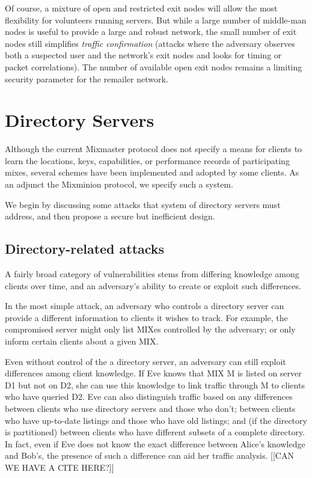 \documentclass{llncs}
\begin{document}
Of course, a mixture of open and restricted exit nodes will allow the
most flexibility for volunteers running servers. But while a large number
of middle-man nodes is useful to provide a large and robust network, the
small number of exit nodes still simplifies \emph{traffic confirmation}
(attacks where the adversary observes both a suspected user and the
network's exit nodes and looks for timing or packet correlations). The
number of available open exit nodes remains a limiting security parameter
for the remailer network.


\section{Directory Servers}
\label{sec:dir-servers}

Although the current Mixmaster protocol does not specify a means for
clients to learn the locations, keys, capabilities, or performance
records of participating mixes, several schemes have been implemented
\cite{mix-stats} and adopted by some clients.  As an adjunct the
Mixminion protocol, we specify such a system.

We begin by discussing some attacks that system of directory servers
must address, and then propose a secure but inefficient design.

\subsection{Directory-related attacks}
\label{subsec:dir-server-attacks}

A fairly broad category of vulnerabilities stems from differing
knowledge among clients over time, and an adversary's ability to
create or exploit such differences.

In the most simple attack, an adversary who controls a directory
server can provide a different information to clients it wishes to
track.  For example, the compromised server might only list MIXes
controlled by the adversary; or only inform certain clients about a
given MIX. 

Even without control of the a directory server, an adversary can still
exploit differences among client knowledge.  If Eve knows that MIX M
is listed on server D1 but not on D2, she can use this knowledge to
link traffic through M to clients who have queried D2.  Eve can also
distinguish traffic based on any differences between clients who use
directory servers and those who don't; between clients who have
up-to-date listings and those who have old listings; and (if the
directory is partitioned) between clients who have different subsets
of a complete directory.  In fact, even if Eve does not know the exact
difference between Alice's knowledge and Bob's, the presence of such a
difference can aid her traffic analysis. [[CAN WE HAVE A CITE HERE?]]
\end{document}
